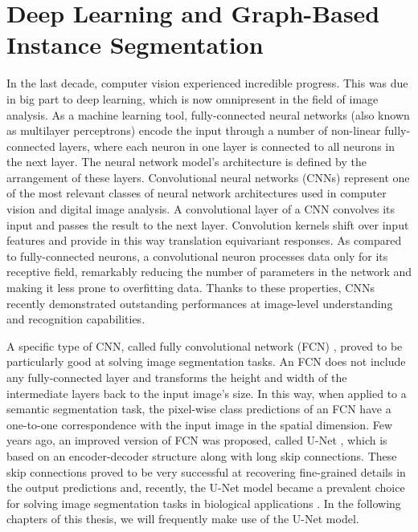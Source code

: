 \newpage
\section{Deep Learning and Graph-Based Instance Segmentation}
In the last decade, computer vision experienced incredible progress. This was due in big part to deep learning, which is now omnipresent in the field of image analysis. As a machine learning tool, fully-connected neural networks (also known as multilayer perceptrons) encode the input through a number of non-linear fully-connected layers, where each neuron in one layer is connected to all neurons in the next layer. The neural network model's architecture is defined by the arrangement of these layers. Convolutional neural networks (CNNs) represent one of the most relevant classes of neural network architectures used in computer vision and digital image analysis. A convolutional layer of a CNN convolves its input and passes the result to the next layer. Convolution kernels shift over input features and provide in this way translation equivariant responses. As compared to fully-connected neurons, a convolutional neuron processes data only for its receptive field, remarkably reducing the number of parameters in the network and making it less prone to overfitting data.
Thanks to these properties, CNNs recently demonstrated outstanding performances at image-level understanding and recognition capabilities.

A specific type of CNN, called fully convolutional network (FCN) \cite{long2015fully}, proved to be particularly good at solving image segmentation tasks. An FCN does not include any fully-connected layer and transforms the height and width of the intermediate layers back to the input image's size. 
In this way, when applied to a semantic segmentation task, the pixel-wise class predictions of an FCN have a one-to-one correspondence with the input image in the spatial dimension.
Few years ago, an improved version of FCN was proposed, called U-Net \cite{ronneberger2015u}, which is based on an encoder-decoder structure along with long skip connections. These skip connections proved to be very successful at recovering fine-grained details in the output predictions and, recently, the U-Net model became a prevalent choice for solving image segmentation tasks in biological applications \cite{lee2017superhuman,ronneberger2015u}. In the following chapters of this thesis, we will frequently make use of the U-Net model. 

